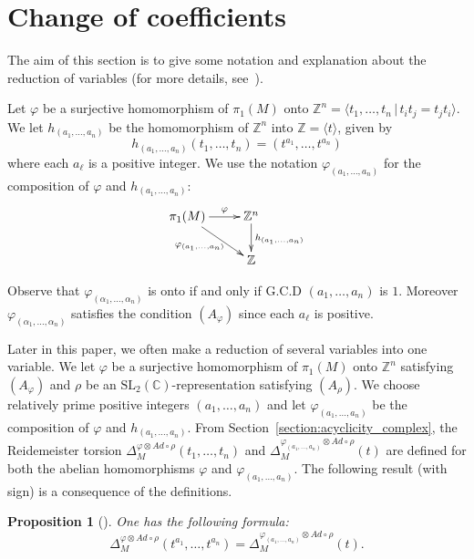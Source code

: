 \documentclass[a4paper]{amsart}
\theoremstyle{plain}
\newtheorem{proposition}[theorem]{Proposition}%
\theoremstyle{definition}
\theoremstyle{remark}
\newcommand{\ZZ}{{\mathbb Z}}
\newcommand{\CC}{{\mathbb C}}
\newcommand{\SL}{{\mathrm{SL}_2(\CC)}}
\newcommand{\PolyTors}[2]{\Delta_{#1}^{#2}}
\newcommand{\otAd}[2]{#1 \otimes Ad \circ #2}
\begin{document}
\section{Change of coefficients}
\label{section:naturality}

The aim of this section is to give some notation and explanation
about the reduction of variables (for more details,
see~\cite{Milnor:1966}).

Let $\varphi$ be a surjective homomorphism of $\pi_1(M)$ onto
$\ZZ^n=\langle t_1, \ldots, t_n \,|\, t_i t_j = t_j t_i \rangle$.  
We let $h_{(a_1, \ldots, a_n)}$ be the homomorphism of $\ZZ^n$ into
$\ZZ=\langle t \rangle$, given by 
\[
h_{(a_1, \ldots, a_n)} (t_1, \ldots, t_n)
=
(t^{a_1}, \ldots, t^{a_n})
\]
where each $a_\ell$ is a positive
integer. We use the notation $\varphi_{(a_1, \ldots, a_n)}$ for the composition of
$\varphi$ and $h_{(a_1, \ldots, a_n)}$:
\begin{equation}\label{diagram:Zm_to_Z}
  \xymatrix@R=20pt{
    \pi_1(M) \ar[r]^-\varphi \ar[dr]_{\varphi_{(a_1, \ldots, a_n)}} & \ZZ^n \ar[d]^{h_{(a_1, \ldots, a_n)}} \\  & \ZZ}
\end{equation}

Observe that $\varphi_{(\alpha_1, \ldots,
  \alpha_n)}$ is onto if and only if G.C.D $(a_1, \ldots, a_n)$
is $1$.  Moreover $\varphi_{(\alpha_1, \ldots, \alpha_n)}$
satisfies the condition $(A_\varphi)$ since each $a_\ell$ is positive.

Later in this paper, we often make a reduction of several variables
into one variable.
We let $\varphi$ be a surjective homomorphism of $\pi_1(M)$ onto
$\ZZ^n$ satisfying $(A_\varphi)$ and $\rho$ be an $\SL$-representation
satisfying $(A_\rho)$.  We choose relatively prime positive integers
$(a_1, \ldots, a_n)$ and let $\varphi_{(a_1, \ldots, a_n)}$ be the
composition of $\varphi$ and $h_{(a_1, \ldots, a_n)}$.  From
Section~\ref{section:acyclicity_complex}, the Reidemeister torsion
$\PolyTors{M}{\otAd{\varphi}{\rho}}(t_1, \ldots, t_n)$ and
$\PolyTors{M}{\otAd{\varphi_{(a_1, \ldots, a_n)}}{\rho}}(t)$ are
defined for both the abelian homomorphisms $\varphi$ and
$\varphi_{(a_1, \ldots, a_n)}$.
The following result (with sign) is a consequence of the definitions. 

\begin{proposition}[\cite{Milnor:1966}]\label{cor:naturality}
  One has the following formula:
  \[
  \PolyTors{M}{\otAd{\varphi}{\rho}}(t^{a_1}, \ldots, t^{a_n}) =
  \PolyTors{M}{\otAd{\varphi_{(a_1, \ldots, a_n)}}{\rho}}(t).
  \]
\end{proposition}
\end{document}
